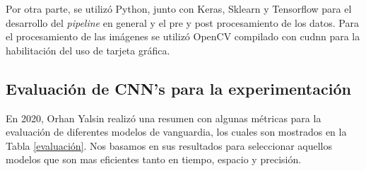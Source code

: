 Por otra parte, se utilizó Python, junto con Keras, Sklearn y Tensorflow 
para el desarrollo del \textit{pipeline} en general y el pre y post 
procesamiento de los datos. Para el procesamiento de las imágenes 
se utilizó OpenCV compilado con cudnn para la habilitación 
del uso de tarjeta gráfica. 

\subsection{Evaluación de CNN's para la experimentación}
En 2020, Orhan Yalsin \cite{DataModelos} realizó una resumen 
con algunas métricas para la evaluación de diferentes 
modelos de vanguardia, los cuales son mostrados 
en la Tabla \ref{evaluación}. Nos basamos en sus resultados 
para seleccionar aquellos modelos que son mas eficientes 
tanto en tiempo, espacio y precisión.

